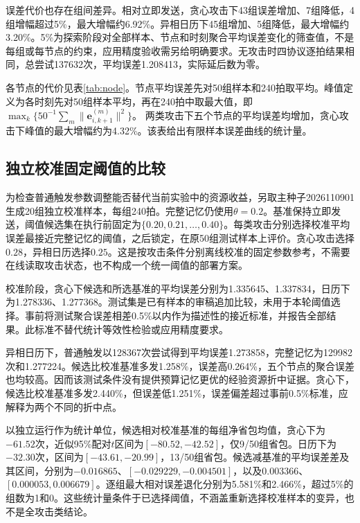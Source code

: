 \documentclass[UTF8,a4paper,zihao=5,fontset=windows]{ctexart}
\begin{document}
误差代价也存在组间差异。相对立即发送，贪心攻击下43组误差增加、7组降低，4组增幅超过5\%，最大增幅约6.92\%。异相日历下45组增加、5组降低，最大增幅约3.20\%。5\%为探索阶段对全部样本、节点和时刻聚合平均误差变化的筛查值，不是每组或每节点的约束，应用精度验收需另给明确要求。无攻击时四协议逐拍结果相同，总尝试137632次，平均误差1.208413，实际延后数为零。

各节点的代价见表\ref{tab:node}。节点平均误差先对50组样本和240拍取平均。峰值定义为各时刻先对50组样本平均，再在240拍中取最大值，即
$\max_k\{50^{-1}\sum_m\|{\bm{e}}_{i,k+1}^{(m)}\|^2\}$。
两类攻击下五个节点的平均误差均增加，贪心攻击下峰值的最大增幅约为4.32\%。该表给出有限样本误差曲线的统计量。


\subsection{独立校准固定阈值的比较}
为检查普通触发参数调整能否替代当前实验中的资源收益，另取主种子2026110901生成20组独立校准样本，每组240拍。完整记忆仍使用$\theta=0.2$。基准保持立即发送，阈值候选集在执行前固定为$\{0.20,0.21,\ldots,0.40\}$。每类攻击分别选择校准平均误差最接近完整记忆的阈值，之后锁定，在原50组测试样本上评价。贪心攻击选择$0.28$，异相日历选择$0.25$。这是按攻击条件分别离线校准的固定参数参考，不需要在线读取攻击状态，也不构成一个统一阈值的部署方案。

校准阶段，贪心下候选和所选基准的平均误差分别为1.335645、1.337834，日历下为1.278336、1.277368。测试集是已有样本的审稿追加比较，未用于本轮阈值选择。事前将测试聚合误差相差0.5\%以内作为描述性的接近标准，并报告全部结果。此标准不替代统计等效性检验或应用精度要求。



异相日历下，普通触发以128367次尝试得到平均误差1.273858，完整记忆为129982次和1.277224。候选比校准基准多发1.258\%，误差高0.264\%，五个节点的聚合误差也均较高。因而该测试条件没有提供预算记忆更优的经验资源折中证据。贪心下，候选比校准基准多发2.440\%，但误差低1.251\%，误差偏差超过事前0.5\%标准，应解释为两个不同的折中点。



以独立运行作为统计单位，候选相对校准基准的每组净省包均值，贪心下为$-61.52$次，近似95\%配对$t$区间为$[-80.52,-42.52]$，仅9/50组省包。日历下为$-32.30$次，区间为$[-43.61,-20.99]$，13/50组省包。候选减基准的平均误差差及其区间，分别为$-0.016865$、$[-0.029229,-0.004501]$，以及$0.003366$、$[0.000053,0.006679]$。逐组最大相对误差退化分别为5.581\%和2.466\%，超过5\%的组数为1和0。这些统计量条件于已选择阈值，不涵盖重新选择校准样本的变异，也不是全攻击类结论。
\end{document}
